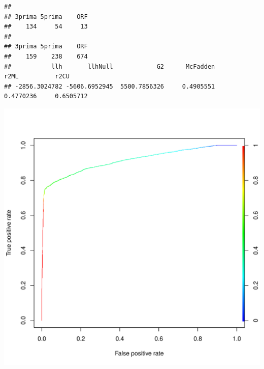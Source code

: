 \documentclass{article}\usepackage[]{graphicx}\usepackage[]{color}
\makeatletter
\def\maxwidth{ %
  \ifdim\Gin@nat@width>\linewidth
    \linewidth
  \else
    \Gin@nat@width
  \fi
}
\newenvironment{kframe}{%
 \def\at@end@of@kframe{}%
 \ifinner\ifhmode%
  \def\at@end@of@kframe{\end{minipage}}%
  \begin{minipage}{\columnwidth}%
 \fi\fi%
 \def\FrameCommand##1{\hskip\@totalleftmargin \hskip-\fboxsep
 \colorbox{shadecolor}{##1}\hskip-\fboxsep
     \hskip-\linewidth \hskip-\@totalleftmargin \hskip\columnwidth}%
 \MakeFramed {\advance\hsize-\width
   \@totalleftmargin\z@ \linewidth\hsize
   \@setminipage}}%
 {\par\unskip\endMakeFramed%
 \at@end@of@kframe}
\newenvironment{knitrout}{}{} %
\makeatother
\begin{document}
\begin{knitrout}
\begin{kframe}
{\ttfamily\noindent\itshape\color{messagecolor}{\#\# Loading required package: gplots}}

{\ttfamily\noindent\itshape\color{messagecolor}{\#\# \\\#\# Attaching package: 'gplots'}}

{\ttfamily\noindent\itshape\color{messagecolor}{\#\# The following object is masked from 'package:stats':\\\#\# \\\#\#\ \ \ \  lowess}}\begin{verbatim}
## 
## 3prima 5prima    ORF 
##    134     54     13
## 
## 3prima 5prima    ORF 
##    159    238    674
##           llh       llhNull            G2      McFadden          r2ML          r2CU 
## -2856.3024782 -5606.6952945  5500.7856326     0.4905551     0.4770236     0.6505712
\end{verbatim}
\end{kframe}

{\centering \includegraphics[width=\maxwidth]{figure/minimal-model-1} 

}



\end{knitrout}
\end{document}
